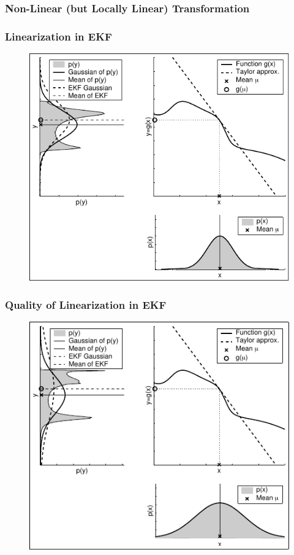 \begin{frame}
    \frametitle{Non-Linear (but Locally Linear) Transformation}

    \begin{center}
    \end{center}


\end{frame}
    
    
\begin{frame}
    \frametitle{Linearization in EKF}

    \begin{figure}[!h]
        \includegraphics[width=0.5\columnwidth]{./images/linearization_applied_by_ekf.pdf}
    \end{figure}
\end{frame}
    
    
\begin{frame}
    \frametitle{Quality of Linearization in EKF}

    \begin{figure}[!h]
        \includegraphics[width=0.5\columnwidth]{./images/dependency_approximation_quality_spread.pdf}
    \end{figure}
\end{frame}
    
